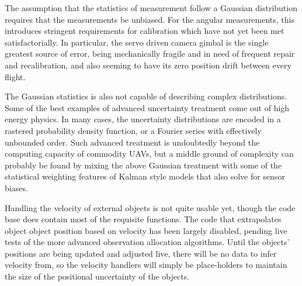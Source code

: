 \documentclass{article}
\begin{document}

    The assumption that the statistics of measurement follow a Gaussian distribution requires that the measurements be unbiased.  For the angular measurements, this introduces stringent requirements for calibration which have not yet been met satisfactorially.  In particular, the servo driven camera gimbal is the single greatest source of error, being mechanically fragile and in need of frequent repair and recalibration, and also seeming to have its zero position drift between every flight.

    The Gaussian statistics is also not capable of describing complex distributions.  Some of the best examples of advanced uncertainty treatment come out of high energy physics.  In many cases, the uncertainty distributions are encoded in a rastered probability density function, or a Fourier series with effectively unbounded order.  Such advanced treatment is undoubtedly beyond the computing capacity of commodity UAVs, but a middle ground of complexity can probably be found by mixing the above Gaussian treatment with some of the statistical weighting features of Kalman style models that also solve for sensor biases.


    Handling the velocity of external objects is not quite usable yet, though the code base does contain most of the requisite functions.  The code that extrapolates object object position based on velocity has been largely disabled, pending live tests of the more advanced observation allocation algorithms.  Until the objects' positions are being updated and adjusted live, there will be no data to infer velocity from, so the velocity handlers will simply be place-holders to maintain the size of the positional uncertainty of the objects.
\end{document}
